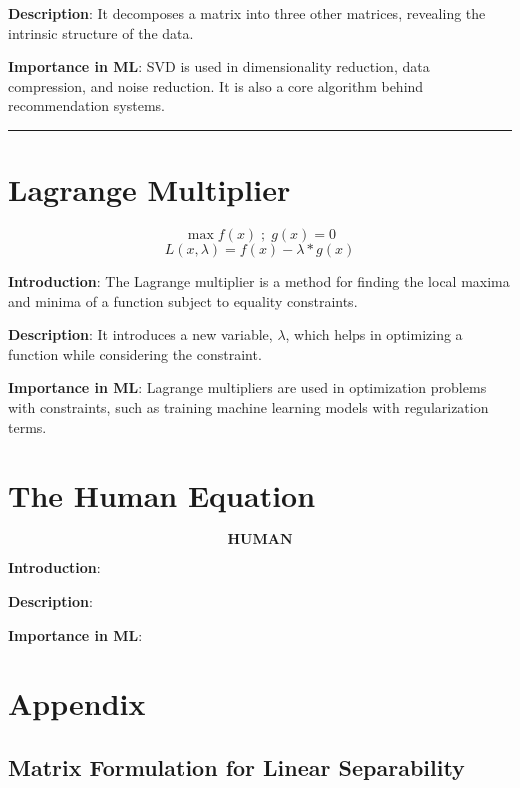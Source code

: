 \documentclass[
  12 pt,
  a4paper,
]{book}
\numberwithin{equation}{section}
\theoremstyle{plain}      %
\theoremstyle{definition} %
\theoremstyle{remark}     %
\theoremstyle{note}         %
\begin{document}
\textbf{Description}: It decomposes a matrix into three other matrices,
revealing the intrinsic structure of the data.

\textbf{Importance in ML}: SVD is used in dimensionality reduction, data
compression, and noise reduction. It is also a core algorithm behind
recommendation systems.

\begin{center}\rule{0.5\linewidth}{0.5pt}\end{center}

\newpage

\hypertarget{lagrange-multiplier}{%
\chapter{Lagrange Multiplier}\label{lagrange-multiplier}}

\[
\max f(x) \;; \; g(x) = 0
\] \[
L(x, \lambda) = f(x) - \lambda \ast g(x)
\]

\textbf{Introduction}: The Lagrange multiplier is a method for finding
the local maxima and minima of a function subject to equality
constraints.

\textbf{Description}: It introduces a new variable, \(\lambda\), which
helps in optimizing a function while considering the constraint.

\textbf{Importance in ML}: Lagrange multipliers are used in optimization
problems with constraints, such as training machine learning models with
regularization terms.

\newpage

\hypertarget{the-human-equation}{%
\chapter{The Human Equation}\label{the-human-equation}}

\[
\textbf{HUMAN}
\]

\textbf{Introduction}:

\textbf{Description}:

\textbf{Importance in ML}:

\newpage

\backmatter

\hypertarget{appendix}{%
\chapter{Appendix}\label{appendix}}

\hypertarget{matrix-formulation-for-linear-separability}{%
\section*{Matrix Formulation for Linear
Separability}\label{matrix-formulation-for-linear-separability}}
\end{document}
